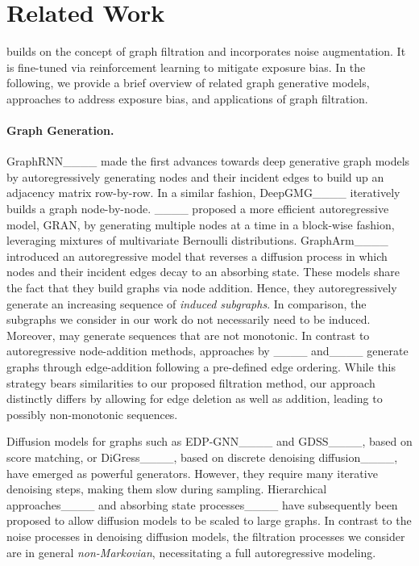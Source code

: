 \section{Related Work}
\label{sec:related-work}
\method builds on the concept of graph filtration and incorporates noise augmentation. It is fine-tuned via reinforcement learning to mitigate exposure bias. In the following, we provide a brief overview of related graph generative models, approaches to address exposure bias, and applications of graph filtration.

\paragraph{Graph Generation.} GraphRNN____ made the first advances towards deep generative graph models by autoregressively generating nodes and their incident edges to build up an adjacency matrix row-by-row. In a similar fashion, DeepGMG____ iteratively builds a graph node-by-node. ____ proposed a more efficient autoregressive model, GRAN, by generating multiple nodes at a time in a block-wise fashion, leveraging mixtures of multivariate Bernoulli distributions. 
GraphArm____ introduced an autoregressive model that reverses a diffusion process in which nodes and their incident edges decay to an absorbing state.
These models share the fact that they build graphs via node addition. Hence, they autoregressively generate an increasing sequence of \emph{induced subgraphs}. In comparison, the subgraphs we consider in our work do not necessarily need to be induced. Moreover, \method may generate sequences that are not monotonic. 
In contrast to autoregressive node-addition methods, approaches by ____ and____ generate graphs through edge-addition following a pre-defined edge ordering. While this strategy bears similarities to our proposed filtration method, our approach distinctly differs by allowing for edge deletion as well as addition, leading to possibly non-monotonic sequences.

Diffusion models for graphs such as EDP-GNN____ and GDSS____, based on score matching, or DiGress____, based on discrete denoising diffusion____, have emerged as powerful generators. However, they require many iterative denoising steps, making them slow during sampling. Hierarchical approaches____ and absorbing state processes____ have subsequently been proposed to allow diffusion models to be scaled to large graphs. In contrast to the noise processes in denoising diffusion models, the filtration processes we consider are in general \emph{non-Markovian}, necessitating a full autoregressive modeling.


